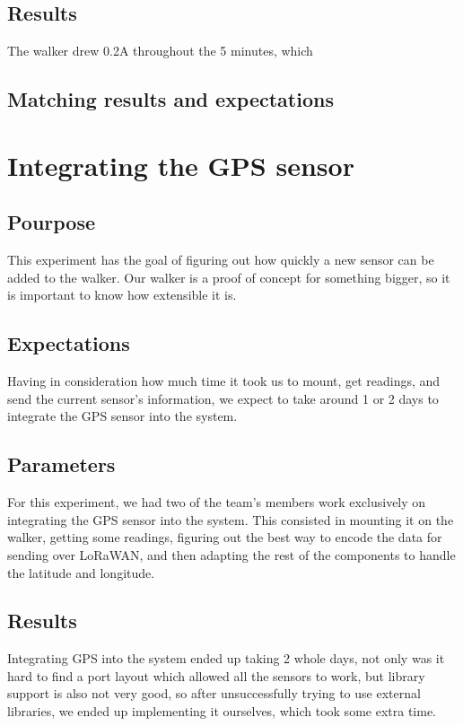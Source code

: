 	\subsection{Results}
		The walker drew 0.2A throughout the 5 minutes, which
	\subsection{Matching results and expectations}

\section{Integrating the GPS sensor}
	\subsection{Pourpose}
	This experiment has the goal of figuring out how quickly a new sensor can be added to the walker. Our walker is a proof of concept for something bigger, so it is important to know how extensible it is.

	\subsection{Expectations}
	Having in consideration how much time it took us to mount, get readings, and send the current sensor's information, we expect to take around 1 or 2 days to integrate the GPS sensor into the system. 

	\subsection{Parameters}
	For this experiment, we had two of the team's members work exclusively on integrating the GPS sensor into the system. This consisted in mounting it on the walker, getting some readings, figuring out the best way to encode the data for sending over LoRaWAN, and then adapting the rest of the components to handle the latitude and longitude.

	\subsection{Results}
	Integrating GPS into the system ended up taking 2 whole days, not only was it hard to find a port layout which allowed all the sensors to work, but library support is also not very good, so after unsuccessfully trying to use external libraries, we ended up implementing it ourselves, which took some extra time.

